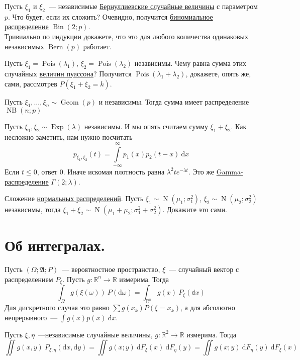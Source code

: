 \documentclass{article}
\newcommand{\A}{{\mathfrak A}}
\begin{document}
    \begin{example}
        Пусть $\xi_1$ и $\xi_2$~--- независимые \hyperref[Распределение Бернулли]{Бернуллиевские случайные величины} с параметром $p$. Что будет, если их сложить? Очевидно, получится \hyperref[Биномиальное распределение]{биномиальное распределение} $\operatorname{Bin}(2;p)$.\\
        Тривиально по индукции докажете, что это для любого количества одинаковых независимых $\operatorname{Bern}(p)$ работает.
    \end{example}
    \begin{example}
        Пусть $\xi_1=\operatorname{Pois}(\lambda_1)$, $\xi_2=\operatorname{Pois}(\lambda_2)$ независимы. Чему равна сумма этих случайных \hyperref[Распределение Пуассона]{величин пуассона}? Получится $\operatorname{Pois}(\lambda_1+\lambda_2)$, докажете, опять же, сами, рассмотрев $P(\xi_1+\xi_2=k)$.
    \end{example}
    \begin{example}
        Пусть $\xi_1,\ldots,\xi_n\sim\hyperref[Geom]{\operatorname{Geom}}(p)$ и независимы. Тогда сумма имеет распределение $\hyperref[NB]{\operatorname{NB}}(n;p)$
    \end{example}
    \begin{example}
        Пусть $\xi_1,\xi_2\sim\hyperref[Exp]{\operatorname{Exp}}(\lambda)$ независимы. И мы опять считаем сумму $\xi_1+\xi_2$. Как несложно заметить, нам нужно посчитать
        $$
        p_{\xi_1,\xi_2}(t)=\int\limits_{-\infty}^\infty p_1(x)p_2(t-x)~\mathrm dx
        $$
        Если $t\leqslant0$, ответ $0$. Иначе искомая плотность равна $\lambda^2te^{-\lambda t}$. Это же \hyperref[Gamma-распределение]{Gamma-распределение} $\Gamma(2;\lambda)$.
    \end{example}
    \begin{example}
        Сложение \hyperref[Нормальное распределение]{нормальных распределений}. Пусть $\xi_1\sim\operatorname{N}(\mu_1;\sigma_1^2)$, $\xi_2\sim\operatorname{N}(\mu_2;\sigma_2^2)$ независимы, тогда $\xi_1+\xi_2\sim\operatorname{N}(\mu_1+\mu_2;\sigma_1^2+\sigma_2^2)$. Докажите это сами.
    \end{example}
    \section{Об интегралах.}
    \begin{remark}
        Пусть $(\Omega;\A;P)$~--- вероятностное пространство, $\xi$~--- случайный вектор с распределением $P_\xi$. Пусть $g\colon\mathbb R^n\to\mathbb R$ измерима. Тогда
        $$
        \int_\Omega g(\xi(\omega))~P(\mathrm d\omega)=\int_{\mathbb R^n}g(x)~P_\xi(\mathbb dx)
        $$
        Для дискретного случая это равно $\sum g(x_k)P(\xi=x_k)$, а для абсолютно непрерывного~--- $\int g(x)p(x)~\mathrm dx$.
    \end{remark}
    \begin{theorem}
        Пусть $\xi,\eta$~---независимые случайные величины, $g\colon\mathbb R^2\to\mathbb R$ измерима. Тогда
        $$
        \iint g(x,y)~P_{\xi,\eta}(\mathrm dx,\mathrm dy)=\iint g(x;y)~\mathrm dF_\xi(x)~\mathrm dF_\eta(y)=\iint g(x;y)~\mathrm dF_\eta(y)~\mathrm dF_\xi(x)
        $$
    \end{theorem}
\end{document}
